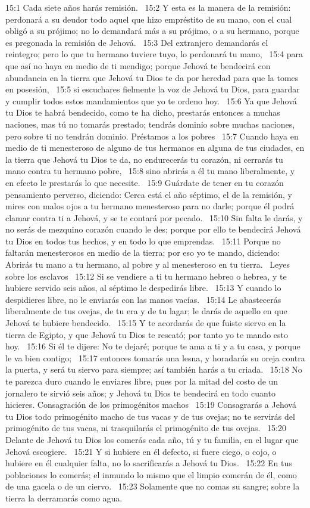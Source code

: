 15:1 Cada siete años harás remisión.  
15:2 Y esta es la manera de la remisión: perdonará a su deudor todo aquel que hizo empréstito de su mano, con el cual obligó a su prójimo; no lo demandará más a su prójimo, o a su hermano, porque es pregonada la remisión de Jehová.  
15:3 Del extranjero demandarás el reintegro; pero lo que tu hermano tuviere tuyo, lo perdonará tu mano,  
15:4 para que así no haya en medio de ti mendigo; porque Jehová te bendecirá con abundancia en la tierra que Jehová tu Dios te da por heredad para que la tomes en posesión,  
15:5 si escuchares fielmente la voz de Jehová tu Dios, para guardar y cumplir todos estos mandamientos que yo te ordeno hoy.  
15:6 Ya que Jehová tu Dios te habrá bendecido, como te ha dicho, prestarás entonces a muchas naciones, mas tú no tomarás prestado; tendrás dominio sobre muchas naciones, pero sobre ti no tendrán dominio. 
Préstamos a los pobres  
15:7 Cuando haya en medio de ti menesteroso de alguno de tus hermanos en alguna de tus ciudades, en la tierra que Jehová tu Dios te da, no endurecerás tu corazón, ni cerrarás tu mano contra tu hermano pobre,  
15:8 sino abrirás a él tu mano liberalmente, y en efecto le prestarás lo que necesite.  
15:9 Guárdate de tener en tu corazón pensamiento perverso, diciendo: Cerca está el año séptimo, el de la remisión, y mires con malos ojos a tu hermano menesteroso para no darle; porque él podrá clamar contra ti a Jehová, y se te contará por pecado.  
15:10 Sin falta le darás, y no serás de mezquino corazón cuando le des; porque por ello te bendecirá Jehová tu Dios en todos tus hechos, y en todo lo que emprendas.  
15:11 Porque no faltarán menesterosos en medio de la tierra; por eso yo te mando, diciendo: Abrirás tu mano a tu hermano, al pobre y al menesteroso en tu tierra.  
Leyes sobre los esclavos   
15:12 Si se vendiere a ti tu hermano hebreo o hebrea, y te hubiere servido seis años, al séptimo le despedirás libre.  
15:13 Y cuando lo despidieres libre, no le enviarás con las manos vacías.  
15:14 Le abastecerás liberalmente de tus ovejas, de tu era y de tu lagar; le darás de aquello en que Jehová te hubiere bendecido.  
15:15 Y te acordarás de que fuiste siervo en la tierra de Egipto, y que Jehová tu Dios te rescató; por tanto yo te mando esto hoy.  
15:16 Si él te dijere: No te dejaré; porque te ama a ti y a tu casa, y porque le va bien contigo;  
15:17 entonces tomarás una lesna, y horadarás su oreja contra la puerta, y será tu siervo para siempre; así también harás a tu criada.  
15:18 No te parezca duro cuando le enviares libre, pues por la mitad del costo de un jornalero te sirvió seis años; y Jehová tu Dios te bendecirá en todo cuanto hicieres. 
Consagración de los primogénitos machos  
15:19 Consagrarás a Jehová tu Dios todo primogénito macho de tus vacas y de tus ovejas; no te servirás del primogénito de tus vacas, ni trasquilarás el primogénito de tus ovejas.  
15:20 Delante de Jehová tu Dios los comerás cada año, tú y tu familia, en el lugar que Jehová escogiere.  
15:21 Y si hubiere en él defecto, si fuere ciego, o cojo, o hubiere en él cualquier falta, no lo sacrificarás a Jehová tu Dios.  
15:22 En tus poblaciones lo comerás; el inmundo lo mismo que el limpio comerán de él, como de una gacela o de un ciervo.  
15:23 Solamente que no comas su sangre; sobre la tierra la derramarás como agua.  
